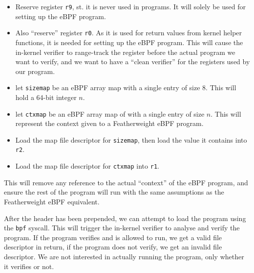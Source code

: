 \begin{itemize}
\item Reserve register \texttt{r9}, st. it is never used in programs. It will solely be used for setting up the eBPF program.
  \item Also ``reserve'' register \texttt{r0}. As it is used for return values from kernel helper functions, it is needed for setting up the eBPF program. This will cause the in-kernel verifier to range-track the register before the actual program we want to verify, and we want to have a ``clean verifier'' for the registers used by our program.
\item let \texttt{sizemap} be an eBPF array map with a single entry of size 8. This will hold a 64-bit integer $n$.
\item let \texttt{ctxmap} be an eBPF array map of with a single entry of size $n$. This will represent the context given to a Featherweight eBPF program.
\item Load the map file descriptor for \texttt{sizemap}, then load the value it contains into \texttt{r2}.
  \item Load the map file descriptor for \texttt{ctxmap} into \texttt{r1}. 
  \end{itemize}
  This will remove any reference to the actual ``context'' of the eBPF program, and ensure the rest of the program will run with the same assumptions as the Featherweight eBPF equivalent.

  
  After the header has been prepended, we can attempt to load the program using the \texttt{bpf} syscall. This will trigger the in-kernel verifier to analyse and verify the program. If the program verifies and is allowed to run, we get a valid file descriptor in return, if the program does not verify, we get an invalid file descriptor.
  We are not interested in actually running the program, only whether it verifies or not.

  

